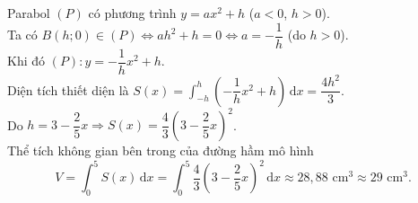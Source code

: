 \begin{bt}
{\begin{center}
		\end{center}
		Parabol $(P)$ có phương trình $y=ax^2+h$  ($a<0$, $h>0$).\\
		Ta có $B(h;0)\in (P)\Leftrightarrow ah^2+h=0\Leftrightarrow a=-\dfrac{1}{h}$ (do $h>0$).\\ 
		Khi  đó $(P)\colon y=-\dfrac{1}{h}x^2+h$.\\
		Diện tích thiết diện là $S(x)=\displaystyle  \int_{-h}^h \left(-\dfrac{1}{h}x^2+h\right) \mathrm{\,d}x=\dfrac{4h^2}{3}$.\\
		 Do $h=3-\dfrac{2}{5}x\Rightarrow S(x)=\dfrac{4}{3}\left(3-\dfrac{2}{5}x\right)^2$.\\
		Thể tích không gian bên trong của đường hầm  mô hình
		$$V=\displaystyle \int_0^5 S(x) \mathrm{\,d}x=\displaystyle \int_0^5 \dfrac{4}{3}\left(3-\dfrac{2}{5}x\right)^2 \mathrm{\,d}x\approx 28{,}88\text{ cm}^3\approx 29\text{  cm}^3.$$
	 }
\end{bt}

